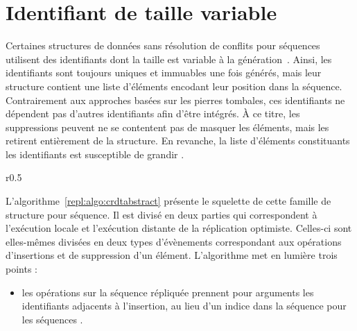
\section{Identifiant de taille variable}

Certaines structures de données sans résolution de conflits pour séquences
utilisent des identifiants dont la taille est variable à la
génération~\cite{andre2013supporting, preguica2009commutative,
  weiss2009logoot}. Ainsi, les identifiants sont toujours uniques et immuables
une fois générés, mais leur structure contient une liste d'éléments encodant
leur position dans la séquence.  Contrairement aux approches basées sur les
pierres tombales, ces identifiants ne dépendent pas d'autres identifiants afin
d'être intégrés. À ce titre, les suppressions peuvent ne se contentent pas de
masquer les éléments, mais les retirent entièrement de la structure. En
revanche, la liste d'éléments constituants les identifiants est susceptible de
grandir . 

\begin{wrapfigure}{r}{0.5\textwidth}
  \vspace{-32pt} %
  \begin{minipage}[t]{0.5\textwidth}
    \begin{algorithm}[H]
      
      \caption{\label{repl:algo:crdtabstract} Squelette.}
    \end{algorithm}
  \end{minipage}
  \vspace{-32pt}
\end{wrapfigure}


L'algorithme~\ref{repl:algo:crdtabstract} présente le squelette de cette famille
de structure pour séquence.  Il est divisé en deux parties qui correspondent à
l'exécution locale et l'exécution distante de la réplication
optimiste. Celles-ci sont elles-mêmes divisées en deux types d'évènements
correspondant aux opérations d'insertions et de suppression d'un
élément. L'algorithme met en lumière trois points :

\begin{itemize}
\item [\textbf{signature :}] les opérations sur la séquence répliquée prennent
  pour arguments les identifiants adjacents à l'insertion, au lieu d'un indice
  dans la séquence pour les séquences .
\end{itemize}

